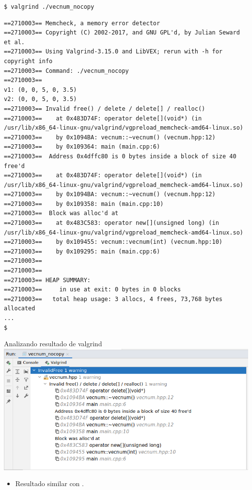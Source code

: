 \begin{frame}[fragile]
\begin{lstlisting}[style=terminal,basicstyle=\tiny\ttfamily]
$ valgrind ./vecnum_nocopy 
\end{lstlisting}
\begin{lstlisting}[style=terminal,basicstyle=\tiny\ttfamily]
==2710003== Memcheck, a memory error detector
==2710003== Copyright (C) 2002-2017, and GNU GPL'd, by Julian Seward et al.
==2710003== Using Valgrind-3.15.0 and LibVEX; rerun with -h for copyright info
==2710003== Command: ./vecnum_nocopy
==2710003== 
v1: (0, 0, 5, 0, 3.5)
v2: (0, 0, 5, 0, 3.5)
==2710003== Invalid free() / delete / delete[] / realloc()
==2710003==    at 0x483D74F: operator delete[](void*) (in /usr/lib/x86_64-linux-gnu/valgrind/vgpreload_memcheck-amd64-linux.so)
==2710003==    by 0x1094BA: vecnum::~vecnum() (vecnum.hpp:12)
==2710003==    by 0x109364: main (main.cpp:6)
==2710003==  Address 0x4dffc80 is 0 bytes inside a block of size 40 free'd
==2710003==    at 0x483D74F: operator delete[](void*) (in /usr/lib/x86_64-linux-gnu/valgrind/vgpreload_memcheck-amd64-linux.so)
==2710003==    by 0x1094BA: vecnum::~vecnum() (vecnum.hpp:12)
==2710003==    by 0x109358: main (main.cpp:10)
==2710003==  Block was alloc'd at
==2710003==    at 0x483C583: operator new[](unsigned long) (in /usr/lib/x86_64-linux-gnu/valgrind/vgpreload_memcheck-amd64-linux.so)
==2710003==    by 0x109455: vecnum::vecnum(int) (vecnum.hpp:10)
==2710003==    by 0x109295: main (main.cpp:6)
==2710003== 
==2710003== 
==2710003== HEAP SUMMARY:
==2710003==     in use at exit: 0 bytes in 0 blocks
==2710003==   total heap usage: 3 allocs, 4 frees, 73,768 bytes allocated
...
$
\end{lstlisting}
\end{frame}

\begin{frame}[t,fragile]{Analizando resultado de valgrind}
\includegraphics[width=\textwidth]{images/02-copia/vecnum-nocopy-valgrind.png}
\begin{itemize}
  \item Resultado similar con .
\end{itemize}
\end{frame}

